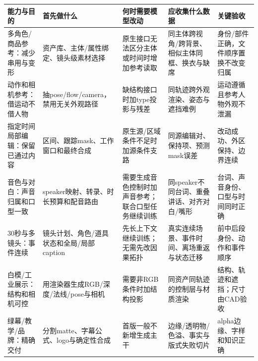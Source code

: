 {\def\LTcaptype{table} %
\small\setlength{\tabcolsep}{3pt}\renewcommand{\arraystretch}{1.18}
\begin{longtable}[]{@{}
  >{\raggedright\arraybackslash}p{}
  >{\raggedright\arraybackslash}p{}
  >{\raggedright\arraybackslash}p{}
  >{\raggedright\arraybackslash}p{}
  >{\raggedright\arraybackslash}p{}@{}}
\toprule\noalign{}
\begin{minipage}[b]{\linewidth}\raggedright
能力与目的
\end{minipage} & \begin{minipage}[b]{\linewidth}\raggedright
首先做什么
\end{minipage} & \begin{minipage}[b]{\linewidth}\raggedright
何时需要模型改动
\end{minipage} & \begin{minipage}[b]{\linewidth}\raggedright
应收集什么数据
\end{minipage} & \begin{minipage}[b]{\linewidth}\raggedright
关键验收
\end{minipage} \\
\midrule\noalign{}
\endhead
\bottomrule\noalign{}
\endlastfoot
多角色/商品参考：减少串用与变形 & 资产库、主体/属性绑定、镜头级素材选择 & 原生接口无法区分主体或时间时增加参考读取 & 同主体跨视角/跨背景、相似主体同框、换衣与缺席 & 身份/部件正确，文件顺序置换不改变归属 \\
动作和相机参考：借运动不借人物 & 抽pose/flow/camera，禁用无关外观路径 & 缺结构接口时加type投影与残差 & 同轨迹跨外观渲染、姿态与遮挡难例 & 运动遵循且参考人物外观不泄漏 \\
指定时间局部编辑：保留已通过内容 & 区间、跟踪mask、工作窗口和最终合成 & 原生源/区域条件不足时加源条件支路 & 同源编辑对、保持项、预测mask误差 & 改动成功、外区保持、边界连续 \\
音色与对白：声音归属和口型一致 & speaker映射、转录、时长预算和配音路由 & 需要生成音色控制时加声音参考；联合口型任务继续训练 & 同speaker不同台词、重叠讲话、对齐对白/嘴形 & 台词、声音身份、口型与时间同时正确 \\
30秒与多镜头：事件连续 & 镜头计划、角色/道具状态和全局/局部caption & 先长上下文继续训练；无需先改因果拓扑 & 真实连续场景、事件时间、离场重返与状态迁移 & 前中后段身份、动作和事件顺序 \\
白模/工业展示：结构和相机可控 & 用渲染器生成RGB/深度/法线/pose与相机 & 需要非RGB条件时加结构投影 & 同资产同轨迹的控制层与材质渲染 & 结构、轨迹和遮挡；尺寸由CAD验收 \\
绿幕/教学/品牌：精确交付 & 分割matte、字幕公式、logo与确定性合成 & 首版一般不新增生成主干 & 边缘/透明物/色溢、事实与版式失败切片 & alpha边缘、字样和知识正确 \\
\end{longtable}
}

